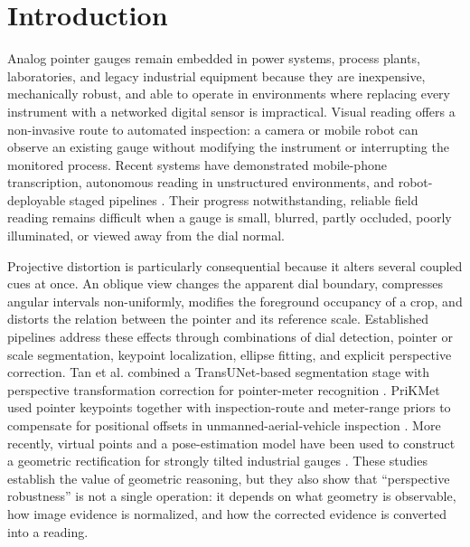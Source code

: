 \documentclass[electronics,article,submit,oneauthor]{Definitions/mdpi}
\begin{document}
\nolinenumbers

\section{Introduction}
\label{sec:introduction}

Analog pointer gauges remain embedded in power systems, process plants, laboratories, and legacy industrial equipment because they are inexpensive, mechanically robust, and able to operate in environments where replacing every instrument with a networked digital sensor is impractical. Visual reading offers a non-invasive route to automated inspection: a camera or mobile robot can observe an existing gauge without modifying the instrument or interrupting the monitored process. Recent systems have demonstrated mobile-phone transcription, autonomous reading in unstructured environments, and robot-deployable staged pipelines \cite{howells2021analogue,milana2022gauges,reitsma2024underpressure}. Their progress notwithstanding, reliable field reading remains difficult when a gauge is small, blurred, partly occluded, poorly illuminated, or viewed away from the dial normal.

Projective distortion is particularly consequential because it alters several coupled cues at once. An oblique view changes the apparent dial boundary, compresses angular intervals non-uniformly, modifies the foreground occupancy of a crop, and distorts the relation between the pointer and its reference scale. Established pipelines address these effects through combinations of dial detection, pointer or scale segmentation, keypoint localization, ellipse fitting, and explicit perspective correction. Tan et al. combined a TransUNet-based segmentation stage with perspective transformation correction for pointer-meter recognition \cite{tan2024transunet}. PriKMet used pointer keypoints together with inspection-route and meter-range priors to compensate for positional offsets in unmanned-aerial-vehicle inspection \cite{chu2025prikmet}. More recently, virtual points and a pose-estimation model have been used to construct a geometric rectification for strongly tilted industrial gauges \cite{lee2026p2yolo}. These studies establish the value of geometric reasoning, but they also show that ``perspective robustness'' is not a single operation: it depends on what geometry is observable, how image evidence is normalized, and how the corrected evidence is converted into a reading.
\end{document}
